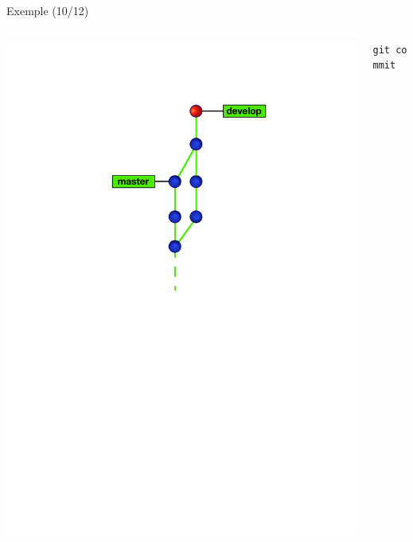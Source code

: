\begin{frame}[fragile]{%
\protect\hypertarget{exemple-1012}{%
Exemple (10/12)}}

\begin{columns}[T]
\begin{column}{0.40\textwidth}
\includegraphics[width=1\textwidth]{images/branch10.pdf}
\end{column}

\begin{column}{0.60\textwidth}
\texttt{git\ commit}
\end{column}
\end{columns}

\end{frame}

